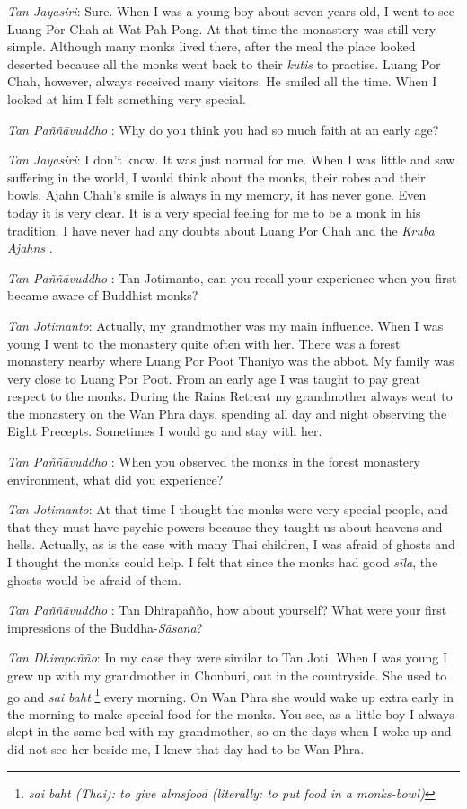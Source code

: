 \emph{Tan Jayasiri}: Sure. When I was a young boy about seven years old,
I went to see Luang Por Chah at Wat Pah Pong. At that time the monastery
was still very simple. Although many monks lived there, after the meal
the place looked deserted because all the monks went back to their
\emph{kutis} to practise. Luang Por Chah, however, always received many
visitors. He smiled all the time. When I looked at him I felt something
very special.

\emph{Tan Paññāvuddho} : Why do you think you had so much faith at an
early age?

\emph{Tan Jayasiri}: I don't know. It was just normal for me. When I was
little and saw suffering in the world, I would think about the monks,
their robes and their bowls. Ajahn Chah's smile is always in my memory,
it has never gone. Even today it is very clear. It is a very special
feeling for me to be a monk in his tradition. I have never had any
doubts about Luang Por Chah and the \emph{Kruba Ajahns  }.

\emph{Tan Paññāvuddho} : Tan Jotimanto, can you recall your experience
when you first became aware of Buddhist monks?

\emph{Tan Jotimanto}: Actually, my grandmother was my main influence.
When I was young I went to the monastery quite often with her. There was
a forest monastery nearby where Luang Por Poot Thaniyo was the abbot. My
family was very close to Luang Por Poot. From an early age I was taught
to pay great respect to the monks. During the Rains Retreat my
grandmother always went to the monastery on the Wan Phra days, spending
all day and night observing the Eight Precepts. Sometimes I would go and
stay with her.

\emph{Tan Paññāvuddho} : When you observed the monks in the forest
monastery environment, what did you experience?

\emph{Tan Jotimanto}: At that time I thought the monks were very special
people, and that they must have psychic powers because they taught us
about heavens and hells. Actually, as is the case with many Thai
children, I was afraid of ghosts and I thought the monks could help. I
felt that since the monks had good \emph{sīla}, the ghosts would be
afraid of them.

\emph{Tan Paññāvuddho} : Tan Dhirapañño, how about yourself? What were
your first impressions of the Buddha-\emph{Sāsana}?

\emph{Tan Dhirapañño}: In my case they were similar to Tan Joti. When I
was young I grew up with my grandmother in Chonburi, out in the
countryside. She used to go and \emph{sai baht} \footnote{\emph{sai baht
  (Thai): to give almsfood (literally: to put food in a monks-bowl)}}
every morning. On Wan Phra she would wake up extra early in the morning
to make special food for the monks. You see, as a little boy I always
slept in the same bed with my grandmother, so on the days when I woke up
and did not see her beside me, I knew that day had to be Wan Phra.

